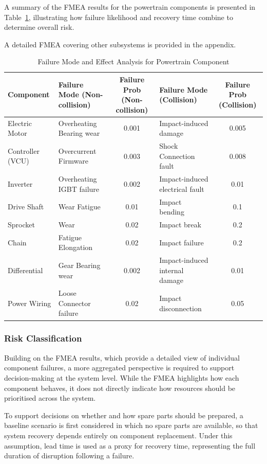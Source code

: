 \documentclass[a4paper,11pt]{article}
\begin{document}
A summary of the FMEA results for the powertrain components is presented in Table~\ref{tab:fmea}, illustrating how failure likelihood and recovery time combine to determine overall risk.

A detailed FMEA covering other subsystems is provided in the appendix.

\begin{table}[H]
\centering
\small
\renewcommand{\arraystretch}{1.5}

\caption{Failure Mode and Effect Analysis for Powertrain Component}
\label{tab:fmea}

\begin{tabularx}{\textwidth}{l X c X c}
\toprule
Component & Failure Mode (Non-collision) & Failure Prob (Non-collision) & Failure Mode (Collision) & Failure Prob (Collision) \\
\midrule
Electric Motor & Overheating Bearing wear & 0.001 & Impact-induced damage & 0.005 \\
Controller (VCU) & Overcurrent Firmware & 0.003 & Shock Connection fault & 0.008 \\
Inverter & Overheating IGBT failure & 0.002 & Impact-induced electrical fault & 0.01 \\
Drive Shaft & Wear Fatigue & 0.01 & Impact bending & 0.1 \\
Sprocket & Wear & 0.02 & Impact break & 0.2 \\
Chain & Fatigue Elongation & 0.02 & Impact failure & 0.2 \\
Differential & Gear Bearing wear & 0.002 & Impact-induced internal damage & 0.01 \\
Power Wiring & Loose Connector failure & 0.02 & Impact disconnection & 0.05 \\
\bottomrule
\end{tabularx}
\end{table}

\subsubsection{Risk Classification}

Building on the FMEA results, which provide a detailed view of individual component failures, a more aggregated perspective is required to support decision-making at the system level. While the FMEA highlights how each component behaves, it does not directly indicate how resources should be prioritised across the system.

To support decisions on whether and how spare parts should be prepared, a baseline scenario is first considered in which no spare parts are available, so that system recovery depends entirely on component replacement. Under this assumption, lead time is used as a proxy for recovery time, representing the full duration of disruption following a failure.
\end{document}

